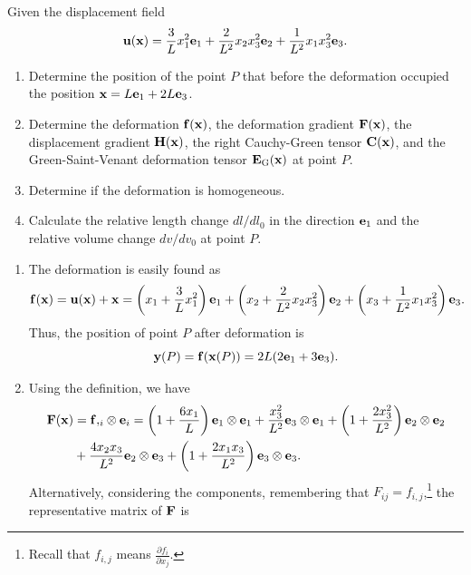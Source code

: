 \begin{exercise}
	Given the displacement field
	\begin{equation}
		\mathbf{u}(\mathbf{x}) = \frac{3}{L}x_1^2\mathbf{e}_1 + \frac{2}{L^2}x_2x_3^2\mathbf{e}_2 + \frac{1}{L^2}x_1x_3^2\mathbf{e}_3.
	\end{equation}
	\begin{enumerate}
		\item Determine the position of the point $P$ that before the deformation occupied the position $\mathbf{x} = L\mathbf{e}_1 + 2L\mathbf{e}_3$.
		\item Determine the deformation $\mathbf{f}(\mathbf{x})$, the deformation gradient $\mathbf{F}(\mathbf{x})$, the displacement gradient $\mathbf{H}(\mathbf{x})$, the right Cauchy-Green tensor $\mathbf{C}(\mathbf{x})$, and the Green-Saint-Venant deformation tensor $\mathbf{E}_{\rm G}(\mathbf{x})$ at point $P$.
		\item Determine if the deformation is homogeneous.
		\item Calculate the relative length change $dl/dl_0$ in the direction $\mathbf{e}_1$ and the relative volume change $dv/dv_0$ at point $P$.
	\end{enumerate}
	\begin{svolgimento}
		\begin{enumerate}
			\item The deformation is easily found as
			\begin{equation}
				\mathbf{f}(\mathbf{x}) = \mathbf{u}(\mathbf{x}) + \mathbf{x} = \left(x_1 + \frac{3}{L}x_1^2\right)\mathbf{e}_1 + \left(x_2 + \frac{2}{L^2}x_2x_3^2\right)\mathbf{e}_2 + \left(x_3 + \frac{1}{L^2}x_1x_3^2\right)\mathbf{e}_3.
			\end{equation}
			Thus, the position of point $P$ after deformation is
			\begin{equation}
				\mathbf{y}(P) = \mathbf{f}(\mathbf{x}(P)) = 2L(2\mathbf{e}_1 + 3\mathbf{e}_3).
			\end{equation}
			\item
			Using the definition, we have
			\begin{equation}
				\begin{aligned}
					\mathbf{F}(\mathbf{x}) &= \mathbf{f}{,_i} \otimes \mathbf{e}_i = \left(1 + \frac{6x_1}{L}\right)\mathbf{e}_1 \otimes \mathbf{e}_1 + \frac{x_3^2}{L^2}\mathbf{e}_3 \otimes \mathbf{e}_1 + \left(1 + \frac{2x_3^2}{L^2}\right)\mathbf{e}_2 \otimes \mathbf{e}_2 \\
					&+ \frac{4x_2x_3}{L^2} \mathbf{e}_2 \otimes \mathbf{e}_3 + \left(1 + \frac{2x_1x_3}{L^2}\right)\mathbf{e}_3 \otimes \mathbf{e}_3.
				\end{aligned}
			\end{equation}
			Alternatively, considering the components, remembering that $F_{ij} = f_{i,j}$,\footnote{Recall that $f_{i,j}$ means $\frac{\partial f_i}{\partial x_j}$.} the representative matrix of $\mathbf{F}$ is

\end{enumerate}
\end{svolgimento}
\end{exercise}
